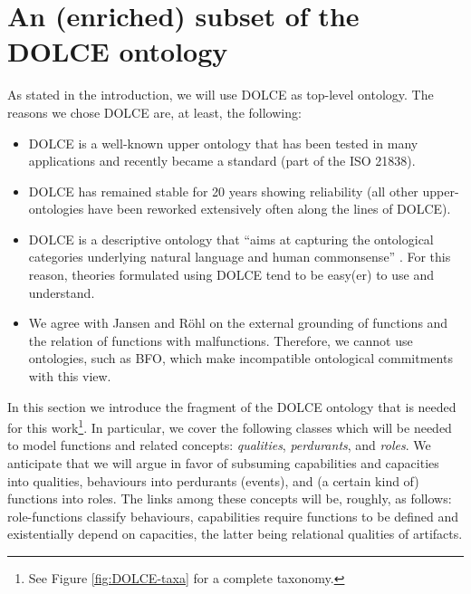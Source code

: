 \documentclass[sw]{iosart2x}
\newcommand{\DOLCE}{\textsc{DOLCE}\xspace} %
\newcommand{\BFO}{\textsc{BFO}\xspace}
\newcommand{\firstTimeKeyWord}[1]{\textit{#1}}
\newcommand{\qquotes}[1]{``#1''}
\begin{document}
\section{An (enriched) subset of the \DOLCE ontology\label{sec:DOLCE}} 
As stated in the introduction, we will use \DOLCE as top-level ontology. 
The reasons we chose \DOLCE are, at least, the following:
\begin{itemize}
  \item \DOLCE is a well-known upper ontology that has been tested in many applications and recently became a standard (part of the ISO 21838).
  \item \DOLCE has remained stable for 20 years showing reliability (all other upper-ontologies have been reworked extensively often along the lines of \DOLCE).
  \item \DOLCE is a descriptive ontology that \qquotes{aims at capturing the ontological categories underlying natural language and human commonsense} \cite{masoloWonderWebDeliverableD182003}. 
  For this reason, theories formulated using \DOLCE tend to be easy(er) to use and understand.
  \item We agree with Jansen and Röhl \cite{rohlWhyFunctionsAre2014,jansenFunctionsMalfunctioningNegative2018} on the external grounding of functions and the relation of functions with malfunctions. 
    Therefore, we cannot use ontologies, such as \BFO, which make incompatible ontological commitments with this view. 
  \end{itemize}

In this section we introduce the fragment of the \DOLCE ontology \cite{masoloWonderWebDeliverableD182003,borgoDOLCEDescriptiveOntology2022} that is needed for this work\footnote{See Figure \ref{fig:DOLCE-taxa} for a complete taxonomy.}. In particular, we cover the following classes which will be needed to model functions and related concepts: \firstTimeKeyWord{qualities}, \firstTimeKeyWord{perdurants}, and \firstTimeKeyWord{roles}. 
We anticipate that we will argue in favor of subsuming capabilities and capacities into qualities, behaviours into perdurants (events), and (a certain kind of) functions into roles. The links among these concepts will be, roughly, as follows: role-functions classify behaviours, 
capabilities require functions to be defined and existentially depend on capacities, the latter being relational qualities of artifacts.
\end{document}
